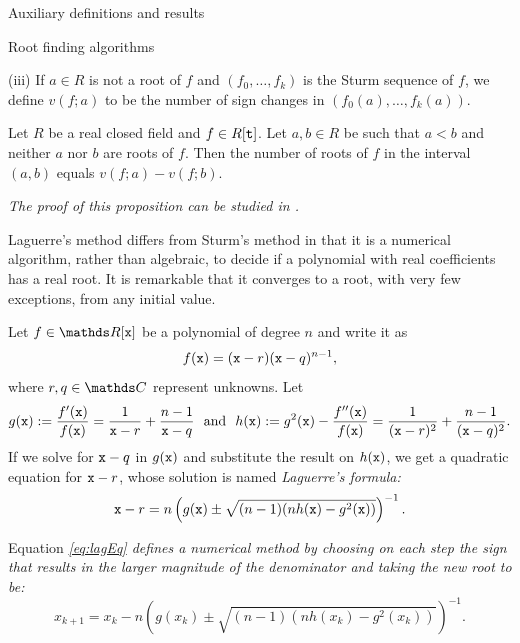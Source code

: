 \documentclass[11pt, a4paper, english, twoside, notitlepage, openright]{report}
\begin{document}
\begin{chapter}{Auxiliary definitions and results}
\begin{section}{Root finding algorithms}
\begin{definitions}
(iii) If $a\in R$ is not a root of $f$ and $(f_0,\dots,f_k)$ is the Sturm sequence of $f$, we define $v(f;a)$ to be the number of sign changes in $(f_0(a),\dots,f_k(a))$.
\end{definitions}
\begin{proposition}\label{sturm} 
Let $R$ be a real closed field and $f\in R[{\tt t}]$. Let $a,b\in R$ be such that $a<b$ and neither $a$ nor $b$ are roots of $f$. Then the number of roots of $f$ in the interval $(a,b)$ equals $v(f;a)-v(f;b)$.

\em The proof of this proposition can be studied in \cite[1.2.10]{bcr}. \em
\end{proposition}

Laguerre's method differs from Sturm's method in that it is a numerical algorithm, rather than algebraic, to decide if a polynomial with real coefficients has a real root. It is remarkable that it converges to a root, with very few exceptions, from any initial value.

\begin{proposition}\label{laguerre}
Let $f\in\R[{\tt x}]$ be a polynomial of degree $n$ and write it as
\begin{equation}\label{eq:lagPol}
f({\tt x})=({\tt x}-r)({\tt x}-q)^{n-1},
\end{equation}
where $r,q\in\C$ represent unknowns. Let 
$$
g({\tt x}):=\frac{f'({\tt x})}{f({\tt x})}=\frac{1}{{\tt x}-r}+\frac{n-1}{{\tt x}-q} \ \text{ and } \ h({\tt x}):=g^2({\tt x})-\frac{f''({\tt x})}{f({\tt x})}=\frac{1}{({\tt x}-r)^2}+\frac{n-1}{({\tt x}-q)^2}.
$$
If we solve for ${\tt x}-q$ in $g({\tt x})$ and substitute the result on $h({\tt x})$, we get a quadratic equation for ${\tt x}-r$, whose solution is named \em Laguerre's formula\em:
\begin{equation}\label{eq:lagEq}
{\tt x}-r=n\left(g({\tt x})\pm\sqrt{(n-1)(nh({\tt x})-g^2({\tt x}))}\right)^{-1}.
\end{equation}

Equation \em \ref{eq:lagEq} \em defines a numerical method by choosing on each step the sign that results in the larger magnitude of the denominator and taking the new root to be:
$$
x_{k+1}=x_k-n\left(g(x_k)\pm\sqrt{ (n-1)(nh(x_k)-g^2(x_k))}\right)^{-1}.
$$
\end{proposition}


\end{section}
\end{chapter}
\end{document}
